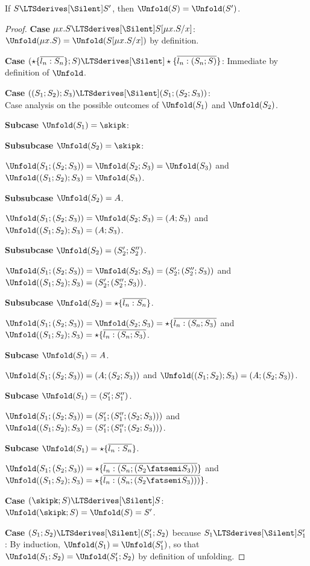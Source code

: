 \begin{lemma}\label{lemma:app:silent-unfold-compatible}
  If $S\LTSderives[\Silent] S'$, then $\Unfold (S) = \Unfold (S')$.
\end{lemma}
\begin{proof}

  \textbf{Case }$\mu x.S \LTSderives[\Silent] S[\mu x.S/x]$:
  $\Unfold (\mu x.S) =  \Unfold (S[\mu x.S/x])$ by definition.

  \textbf{Case }$    {(\star\{\overline{l_n:S_n}\}; S) \LTSderives[\Silent]
    \star\{\overline{l_n:(S_n; S)}\}}$: Immediate by definition of
  $\Unfold$.
  
  \textbf{Case }${((S_1;S_2); S_3) \LTSderives[\Silent] (S_1; (S_2;
    S_3))}$: \\
  Case analysis on the possible outcomes of $\Unfold (S_1)$ and $\Unfold (S_2)$. 

  \textbf{Subcase } $\Unfold (S_1) = \skipk$:
  
  \textbf{Subsubcase }$\Unfold (S_2) = \skipk$:
  
  $\Unfold  (S_1; (S_2;  S_3)) = \Unfold (S_2; S_3) = \Unfold (S_3)$
  and
  $\Unfold ((S_1; S_2); S_3) = \Unfold (S_3)$.

  \textbf{Subsubcase }$\Unfold (S_2) = A$.

  $\Unfold  (S_1; (S_2;  S_3)) = \Unfold (S_2; S_3) = (A; S_3)$
  and
  $\Unfold ((S_1; S_2); S_3) = (A; S_3)$.

  \textbf{Subsubcase }$\Unfold (S_2) = (S_2'; S_2'')$.

  $\Unfold  (S_1; (S_2;  S_3)) = \Unfold (S_2; S_3) = (S_2' ;( S_2''; S_3))$
  and
  $\Unfold ((S_1; S_2); S_3) = (S_2'; (S_2''; S_3))$.

  \textbf{Subsubcase }$\Unfold (S_2) =
  \star\{\overline{l_n:S_n}\}$.

  $\Unfold  (S_1; (S_2;  S_3)) = \Unfold (S_2; S_3) =
  \star\{\overline{l_n:(S_n; S_3)} $
  and
  $\Unfold ((S_1; S_2); S_3) = \star\{\overline{l_n:(S_n; S_3)}$.

  \textbf{Subcase }$\Unfold (S_1) = A$.

  $\Unfold  (S_1; (S_2;  S_3)) =(A; (S_2; S_3))$
  and
  $\Unfold ((S_1; S_2); S_3) = (A; (S_2; S_3))$.

  \textbf{Subcase }$\Unfold (S_1) = (S_1';S_1'')$.

  $\Unfold  (S_1; (S_2;  S_3)) =(S_1'; (S_1''; (S_2; S_3)))$
  and
  $\Unfold ((S_1; S_2); S_3) = (S_1'; (S_1''; (S_2; S_3)))$.

  \textbf{Subcase }$\Unfold (S_1) = \star\{\overline{l_n:S_n}\}$.

  $\Unfold  (S_1; (S_2;  S_3)) =\star\{\overline{l_n:(S_n;
    (S_2\fatsemi S_3))}\} $
  and
  $\Unfold ((S_1; S_2); S_3) = \star\{\overline{l_n:(S_n; (S_2\fatsemi
    S_3)))}\}$.

  \textbf{Case }${(\skipk; S) \LTSderives[\Silent] S}$:
  $\Unfold (\skipk;S) = \Unfold (S) = S'$.

  \textbf{Case }$(S_1; S_2) \LTSderives[\Silent] (S_1';S_2)$
  because $S_1 \LTSderives[\Silent] S_1'$: By induction, $\Unfold
  (S_1) = \Unfold(S_1')$, so that $\Unfold (S_1; S_2) = \Unfold
  (S_1';S_2)$ by definition of unfolding.
\end{proof}
